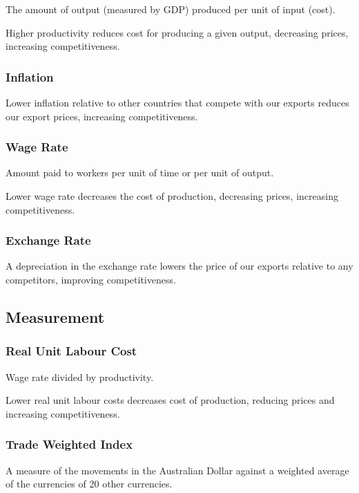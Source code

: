 \documentclass[a4paper,11pt]{article}
\begin{document}
The amount of output (measured by GDP) produced per unit of input (cost).

Higher productivity reduces cost for producing a given output, decreasing
prices, increasing competitiveness.


\subsubsection{Inflation}

Lower inflation relative to other countries that compete with our exports
reduces our export prices, increasing competitiveness.


\subsubsection{Wage Rate}

Amount paid to workers per unit of time or per unit of output.

Lower wage rate decreases the cost of production, decreasing prices, increasing
competitiveness.


\subsubsection{Exchange Rate}

A depreciation in the exchange rate lowers the price of our exports relative to
any competitors, improving competitiveness.


\subsection{Measurement}

\subsubsection{Real Unit Labour Cost}

Wage rate divided by productivity.

Lower real unit labour costs decreases cost of production, reducing prices and
increasing competitiveness.


\subsubsection{Trade Weighted Index}

A measure of the movements in the Australian Dollar against a weighted average
of the currencies of 20 other currencies.
\end{document}
